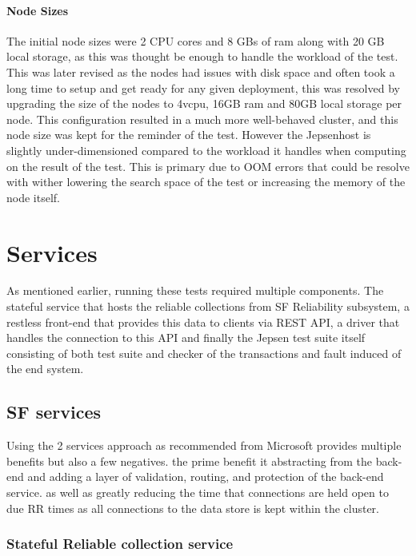 \documentclass[a4paper,10pt,titlepage]{report}
\begin{document}
    \paragraph*{Node Sizes}

    The initial node sizes were 2 CPU cores and 8 GBs of ram along with 20 GB local storage, as this was thought be enough to handle the workload of the test. This was later revised as the nodes had issues with disk space and often took a long time to setup and get ready for any given deployment, this was resolved by upgrading the size of the nodes to 4vcpu, 16GB ram and 80GB local storage per node. This configuration resulted in a much more well-behaved cluster, and this node size was kept for the reminder of the test. However the Jepsenhost is slightly under-dimensioned compared to the workload it handles when computing on the result of the test. This is primary due to OOM errors that could be resolve with wither lowering the search space of the test or increasing the memory of the node itself.


    \section{Services}
    As mentioned earlier, running these tests required multiple components. The stateful service that hosts the reliable collections from SF Reliability subsystem, a restless front-end that provides this data to clients via REST API, a driver that handles the connection to this API and finally the Jepsen test suite itself consisting of both test suite and checker of the transactions and fault induced of the end system.

    \subsection{SF services}
    Using the 2 services approach as recommended from Microsoft provides multiple benefits but also a few negatives. the prime benefit it abstracting from the back-end and adding a layer of validation, routing, and protection of the back-end service. as well as greatly reducing the time that connections are held open to due RR times as all connections to the data store is kept within the cluster.

    \subsubsection{Stateful Reliable collection service}
\end{document}
